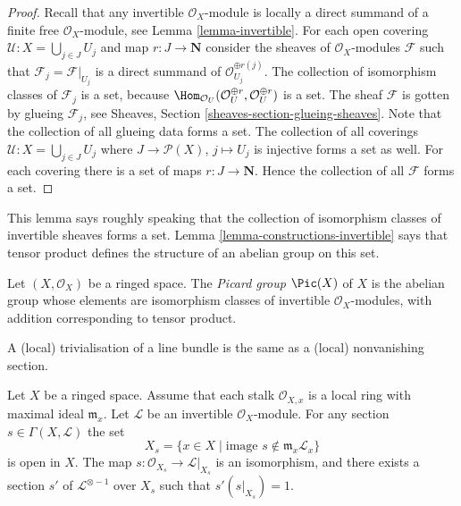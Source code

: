 \begin{proof}
Recall that any invertible $\mathcal{O}_X$-module is locally
a direct summand of a finite free $\mathcal{O}_X$-module, see
Lemma \ref{lemma-invertible}.
For each open covering $\mathcal{U} : X = \bigcup_{j \in J} U_j$
and map $r : J \to \mathbf{N}$ consider the sheaves of
$\mathcal{O}_X$-modules $\mathcal{F}$ such that
$\mathcal{F}_j = \mathcal{F}|_{U_j}$ is a direct summand of
$\mathcal{O}_{U_j}^{\oplus r(j)}$.
The collection of isomorphism classes of $\mathcal{F}_j$ is a set, because
$\Hom_{\mathcal{O}_U}(\mathcal{O}_U^{\oplus r}, \mathcal{O}_U^{\oplus r})$
is a set. The sheaf $\mathcal{F}$ is gotten by glueing $\mathcal{F}_j$,
see Sheaves, Section
\ref{sheaves-section-glueing-sheaves}. Note that the collection of
all glueing data forms a set. The collection of all coverings
$\mathcal{U} : X = \bigcup_{j \in J} U_j$ where $J \to \mathcal{P}(X)$,
$j \mapsto U_j$ is injective forms a set as well. For each covering
there is a set of maps $r : J \to \mathbf{N}$. Hence the collection
of all $\mathcal{F}$ forms a set.
\end{proof}

\noindent
This lemma says roughly speaking that the collection of
isomorphism classes of invertible sheaves forms a set.
Lemma \ref{lemma-constructions-invertible} says that
tensor product defines the structure of an abelian group
on this set.

\begin{definition}
\label{definition-pic}
Let $(X, \mathcal{O}_X)$ be a ringed space.
The {\it Picard group} $\Pic(X)$ of $X$ is the
abelian group whose elements are isomorphism classes of
invertible $\mathcal{O}_X$-modules, with addition
corresponding to tensor product.
\end{definition}

\begin{lemma}
\label{lemma-s-open}
\begin{slogan}
A (local) trivialisation of a line bundle
is the same as a (local) nonvanishing section.
\end{slogan}
Let $X$ be a ringed space. Assume that each stalk $\mathcal{O}_{X, x}$
is a local ring with maximal ideal $\mathfrak m_x$.
Let $\mathcal{L}$ be an invertible $\mathcal{O}_X$-module.
For any section $s \in \Gamma(X, \mathcal{L})$ the set
$$
X_s = \{x \in X \mid \text{image }s \not\in \mathfrak m_x\mathcal{L}_x\}
$$
is open in $X$. The map $s : \mathcal{O}_{X_s} \to \mathcal{L}|_{X_s}$
is an isomorphism, and there exists a section $s'$
of $\mathcal{L}^{\otimes -1}$ over $X_s$ such that $s' (s|_{X_s}) = 1$.
\end{lemma}

